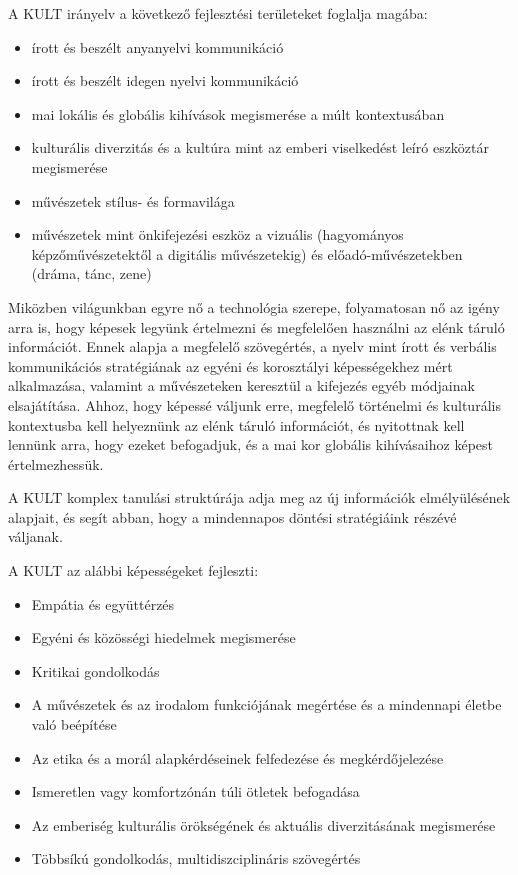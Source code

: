 A KULT irányelv a következő fejlesztési területeket foglalja magába:
\begin{itemize}
  \item írott és beszélt anyanyelvi kommunikáció

  \item írott és beszélt idegen nyelvi kommunikáció

  \item mai lokális és globális kihívások megismerése a múlt kontextusában

  \item kulturális diverzitás és a kultúra mint az emberi viselkedést leíró eszköztár megismerése

  \item művészetek stílus- és formavilága

  \item művészetek mint önkifejezési eszköz a vizuális (hagyományos képzőművészetektől a digitális művészetekig) és előadó-művészetekben (dráma, tánc, zene)
\end{itemize}

Miközben világunkban egyre nő a technológia szerepe, folyamatosan nő az igény arra is, hogy képesek legyünk értelmezni és megfelelően használni az elénk táruló információt. Ennek alapja a megfelelő szövegértés, a nyelv mint írott és verbális kommunikációs stratégiának az egyéni és korosztályi képességekhez mért alkalmazása, valamint a művészeteken keresztül a kifejezés egyéb módjainak elsajátítása. Ahhoz, hogy képessé váljunk erre, megfelelő történelmi és kulturális kontextusba kell helyeznünk az elénk táruló információt, és nyitottnak kell lennünk arra, hogy ezeket befogadjuk, és a mai kor globális kihívásaihoz képest értelmezhessük.

A KULT komplex tanulási struktúrája adja meg az új információk elmélyülésének alapjait, és segít abban, hogy a mindennapos döntési stratégiáink részévé váljanak.

A KULT az alábbi képességeket fejleszti:
\begin{itemize}
  \item Empátia és együttérzés

  \item Egyéni és közösségi hiedelmek megismerése

  \item Kritikai gondolkodás

  \item A művészetek és az irodalom funkciójának megértése és a mindennapi életbe való beépítése

  \item Az etika és a morál alapkérdéseinek felfedezése és megkérdőjelezése

  \item Ismeretlen vagy komfortzónán túli ötletek befogadása

  \item Az emberiség kulturális örökségének és aktuális diverzitásának megismerése

  \item Többsíkú gondolkodás, multidiszciplináris szövegértés
\end{itemize}

